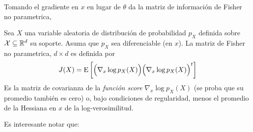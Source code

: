 Tomando el gradiente  en $x$ en lugar de $\theta$ da  la matriz de informaci\'on
de Fisher no parametrica,
%
\begin{definicion}
  Sea  $X$  una  variable  aleatoria  de distribuci\'on  de  probabilidad  $p_X$
  definida  sobre  $\mathcal{X} \subseteq  \mathbb{R}^d$  su  soporte.   Asuma que  $p_X$  sea
  diferenciable (en $x$).   La matriz de Fisher no parametrica,  $d \times d$ es
  definida por
  \[
  J(X) =  \operatorname{E}\left[ \Big(  \nabla_x \log p_X(X)  \Big) \Big(  \nabla_x \log
      p_X(X) \Big)^t \right]
  \]
  Es la matriz de covarianza de  la {\it funci\'on score} $\nabla_x \log p_X(X)$
  (se  proba  que  su  promedio  tambi\'en  es  cero)  o,  bajo  condiciones  de
  regularidad, menos el promedio de la Hessiana en $x$ de la log-verosimilitud.
\end{definicion}
%
Es interesante notar que:
%
